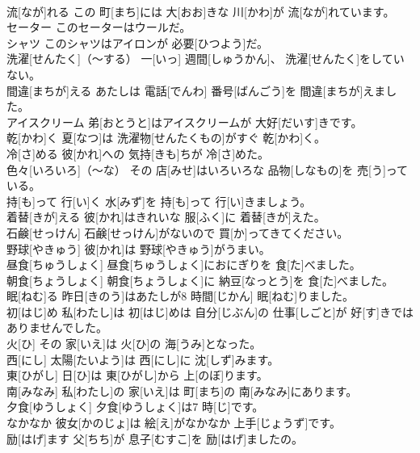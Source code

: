 \documentclass[8pt]{extreport}
\begin{document}
\begin{CJK}{UTF8}{min}
\\	流[なが]れる	この 町[まち]には 大[おお]きな 川[かわ]が 流[なが]れています。		
\\	セーター	このセーターはウールだ。		
\\	シャツ	このシャツはアイロンが 必要[ひつよう]だ。		
\\	洗濯[せんたく]（～する）	一[いっ] 週間[しゅうかん]、 洗濯[せんたく]をしていない。		
\\	間違[まちが]える	あたしは 電話[でんわ] 番号[ばんごう]を 間違[まちが]えました。		
\\	アイスクリーム	弟[おとうと]はアイスクリームが 大好[だいす]きです。		
\\	乾[かわ]く	夏[なつ]は 洗濯物[せんたくもの]がすぐ 乾[かわ]く。		
\\	冷[さ]める	彼[かれ]への 気持[きも]ちが 冷[さ]めた。		
\\	色々[いろいろ]（～な）	その 店[みせ]はいろいろな 品物[しなもの]を 売[う]っている。		
\\	持[も]って 行[い]く	水[みず]を 持[も]って 行[い]きましょう。		
\\	着替[きが]える	彼[かれ]はきれいな 服[ふく]に 着替[きが]えた。		
\\	石鹸[せっけん]	石鹸[せっけん]がないので 買[か]ってきてください。		
\\	野球[やきゅう]	彼[かれ]は 野球[やきゅう]がうまい。		
\\	昼食[ちゅうしょく]	昼食[ちゅうしょく]におにぎりを 食[た]べました。		
\\	朝食[ちょうしょく]	朝食[ちょうしょく]に 納豆[なっとう]を 食[た]べました。		
\\	眠[ねむ]る	昨日[きのう]はあたしが8 時間[じかん] 眠[ねむ]りました。		
\\	初[はじ]め	私[わたし]は 初[はじ]めは 自分[じぶん]の 仕事[しごと]が 好[す]きではありませんでした。		
\\	火[ひ]	その 家[いえ]は 火[ひ]の 海[うみ]となった。		
\\	西[にし]	太陽[たいよう]は 西[にし]に 沈[しず]みます。		
\\	東[ひがし]	日[ひ]は 東[ひがし]から 上[のぼ]ります。		
\\	南[みなみ]	私[わたし]の 家[いえ]は 町[まち]の 南[みなみ]にあります。		
\\	夕食[ゆうしょく]	夕食[ゆうしょく]は7 時[じ]です。		
\\	なかなか	彼女[かのじょ]は 絵[え]がなかなか 上手[じょうず]です。		
\\	励[はげ]ます	父[ちち]が 息子[むすこ]を 励[はげ]ましたの。		

\end{CJK}
\end{document}
